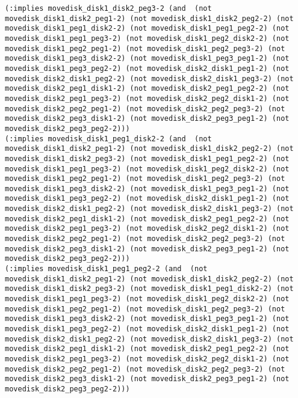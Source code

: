 \documentclass[12pt,letterpaper]{ntdhw}
\begin{document}
\begin{enumerate}
\begin{enumerate}
\begin{lstlisting}[language=pddl, style=pddlstyle,
  basicstyle=\scriptsize]
(:implies movedisk_disk1_disk2_peg3-2 (and  (not movedisk_disk1_disk2_peg1-2) (not movedisk_disk1_disk2_peg2-2) (not movedisk_disk1_peg1_disk2-2) (not movedisk_disk1_peg1_peg2-2) (not movedisk_disk1_peg1_peg3-2) (not movedisk_disk1_peg2_disk2-2) (not movedisk_disk1_peg2_peg1-2) (not movedisk_disk1_peg2_peg3-2) (not movedisk_disk1_peg3_disk2-2) (not movedisk_disk1_peg3_peg1-2) (not movedisk_disk1_peg3_peg2-2) (not movedisk_disk2_disk1_peg1-2) (not movedisk_disk2_disk1_peg2-2) (not movedisk_disk2_disk1_peg3-2) (not movedisk_disk2_peg1_disk1-2) (not movedisk_disk2_peg1_peg2-2) (not movedisk_disk2_peg1_peg3-2) (not movedisk_disk2_peg2_disk1-2) (not movedisk_disk2_peg2_peg1-2) (not movedisk_disk2_peg2_peg3-2) (not movedisk_disk2_peg3_disk1-2) (not movedisk_disk2_peg3_peg1-2) (not movedisk_disk2_peg3_peg2-2)))
(:implies movedisk_disk1_peg1_disk2-2 (and  (not movedisk_disk1_disk2_peg1-2) (not movedisk_disk1_disk2_peg2-2) (not movedisk_disk1_disk2_peg3-2) (not movedisk_disk1_peg1_peg2-2) (not movedisk_disk1_peg1_peg3-2) (not movedisk_disk1_peg2_disk2-2) (not movedisk_disk1_peg2_peg1-2) (not movedisk_disk1_peg2_peg3-2) (not movedisk_disk1_peg3_disk2-2) (not movedisk_disk1_peg3_peg1-2) (not movedisk_disk1_peg3_peg2-2) (not movedisk_disk2_disk1_peg1-2) (not movedisk_disk2_disk1_peg2-2) (not movedisk_disk2_disk1_peg3-2) (not movedisk_disk2_peg1_disk1-2) (not movedisk_disk2_peg1_peg2-2) (not movedisk_disk2_peg1_peg3-2) (not movedisk_disk2_peg2_disk1-2) (not movedisk_disk2_peg2_peg1-2) (not movedisk_disk2_peg2_peg3-2) (not movedisk_disk2_peg3_disk1-2) (not movedisk_disk2_peg3_peg1-2) (not movedisk_disk2_peg3_peg2-2)))
(:implies movedisk_disk1_peg1_peg2-2 (and  (not movedisk_disk1_disk2_peg1-2) (not movedisk_disk1_disk2_peg2-2) (not movedisk_disk1_disk2_peg3-2) (not movedisk_disk1_peg1_disk2-2) (not movedisk_disk1_peg1_peg3-2) (not movedisk_disk1_peg2_disk2-2) (not movedisk_disk1_peg2_peg1-2) (not movedisk_disk1_peg2_peg3-2) (not movedisk_disk1_peg3_disk2-2) (not movedisk_disk1_peg3_peg1-2) (not movedisk_disk1_peg3_peg2-2) (not movedisk_disk2_disk1_peg1-2) (not movedisk_disk2_disk1_peg2-2) (not movedisk_disk2_disk1_peg3-2) (not movedisk_disk2_peg1_disk1-2) (not movedisk_disk2_peg1_peg2-2) (not movedisk_disk2_peg1_peg3-2) (not movedisk_disk2_peg2_disk1-2) (not movedisk_disk2_peg2_peg1-2) (not movedisk_disk2_peg2_peg3-2) (not movedisk_disk2_peg3_disk1-2) (not movedisk_disk2_peg3_peg1-2) (not movedisk_disk2_peg3_peg2-2)))

\end{lstlisting}
\end{enumerate}
\end{enumerate}
\end{document}
